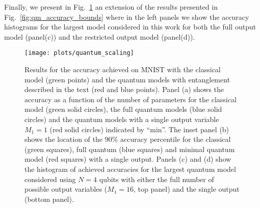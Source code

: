Finally, we present in Fig.~\ref{fig:aqm_accuracy} an extension of the results presented in Fig.~\ref{fig:qm_accuracy_bounds} where in the left panels we show the accuracy histograms for the largest model considered in this work for both the full output model (panel(c)) and the restricted output model (panel(d)).

\begin{figure}[]
	\centering
	 \texttt{[image: plots/quantum\_scaling]}
	\caption{ Results for the accuracy achieved on MNIST with the classical model (green points) and the quantum models with entanglement described in the text (red and blue points). Panel (a) shows the accuracy as a function of the number of parameters for the classical model (green solid circles), the full quantum models (blue solid circles) and the quantum models with a single output variable $M_1=1$ (red solid circles) indicated by ``min''. The inset panel (b) shows the location of the $90\%$ accuracy percentile for the classical (green squares), full quantum (blue squares) and minimal quantum model (red squares) with a single output. Panels (c) and (d) show the histogram of achieved accuracies for the largest quantum model considered using $N=4$ qubits with either the full number of possible output variables ($M_1=16$, top panel) and the single output (bottom panel). }
	\label{fig:aqm_accuracy}
\end{figure}
